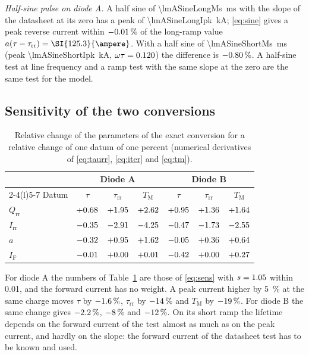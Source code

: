 \documentclass[10pt,a4paper]{scrartcl}
\newcommand{\IF}{I_\mathrm{F}}
\newcommand{\Irr}{I_\mathrm{rr}}
\newcommand{\Qrr}{Q_\mathrm{rr}}
\newcommand{\taurr}{\tau_\mathrm{rr}}
\newcommand{\TM}{T_\mathrm{M}}
\begin{document}
\emph{Half-sine pulse on diode A.} A half sine of \SI{\lmASineLongMs}{\milli\second} with the slope of the datasheet at its zero has a peak of \SI{\lmASineLongIpk}{\kilo\ampere}; \eqref{eq:sine} gives a peak reverse current within $-0.01\,\%$ of the long-ramp value $a(\tau-\taurr) = \SI{\lmALongIrr}{\ampere}$. With a half sine of \SI{\lmASineShortMs}{\milli\second} (peak \SI{\lmASineShortIpk}{\kilo\ampere}, $\omega\tau = 0.120$) the difference is $-0.80\,\%$. A half-sine test at line frequency and a ramp test with the same slope at the zero are the same test for the model.

\subsection{Sensitivity of the two conversions}
\begin{table}[htb]
\centering\small
\caption{Relative change of the parameters of the exact conversion for a relative change of one datum of one percent (numerical derivatives of \eqref{eq:taurr}, \eqref{eq:iter} and \eqref{eq:tm}).}
\label{tab:sensex}
\begin{tabular}{@{}lcccccc@{}}
\toprule
 & \multicolumn{3}{c}{Diode A} & \multicolumn{3}{c}{Diode B} \\
\cmidrule(lr){2-4}\cmidrule(l){5-7}
Datum & $\tau$ & $\taurr$ & $\TM$ & $\tau$ & $\taurr$ & $\TM$ \\
\midrule
$\Qrr$ & $+0.68$ & $+1.95$ & $+2.62$ & $+0.95$ & $+1.36$ & $+1.64$ \\
$\Irr$ & $-0.35$ & $-2.91$ & $-4.25$ & $-0.47$ & $-1.73$ & $-2.55$ \\
$a$ & $-0.32$ & $+0.95$ & $+1.62$ & $-0.05$ & $+0.36$ & $+0.64$ \\
$\IF$ & $-0.01$ & $+0.00$ & $+0.01$ & $-0.42$ & $+0.00$ & $+0.27$ \\
\bottomrule
\end{tabular}
\end{table}
For diode A the numbers of Table~\ref{tab:sensex} are those of \eqref{eq:sens} with $s = 1.05$ within \num{0.01}, and the forward current has no weight. A peak current higher by \SI{5}{\percent} at the same charge moves $\tau$ by $-1.6\,\%$, $\taurr$ by $-14\,\%$ and $\TM$ by $-19\,\%$. For diode B the same change gives $-2.2\,\%$, $-8\,\%$ and $-12\,\%$. On its short ramp the lifetime depends on the forward current of the test almost as much as on the peak current, and hardly on the slope: the forward current of the datasheet test has to be known and used.
\end{document}
